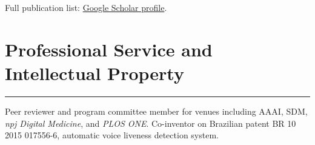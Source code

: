 \documentclass[10pt,letterpaper]{article}
\newcommand{\sectionrule}{\vspace{-0.1em}\hrule\vspace{0.25em}}
\begin{document}
	Full publication list: \href{https://scholar.google.com/citations?user=pn7hL2cAAAAJ&hl=en}{Google Scholar profile}.
	
	\section*{Professional Service and Intellectual Property}
	\sectionrule
	Peer reviewer and program committee member for venues including AAAI, SDM, \textit{npj Digital Medicine}, and \textit{PLOS ONE}. Co-inventor on Brazilian patent BR 10 2015 017556-6, automatic voice liveness detection system.
	
\end{document}
